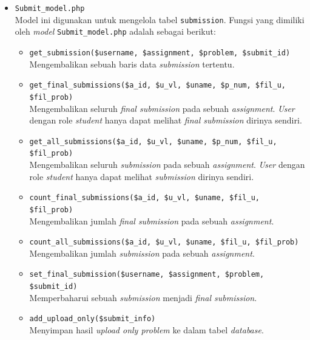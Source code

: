 \documentclass[a4paper,twoside]{article}
\begin{document}
\begin{enumerate}
\begin{itemize}
\begin{itemize}
			                  \vspace{0.5cm}
			            \item \verb|Submit_model.php| \\
			                  Model ini digunakan untuk mengelola tabel \verb|submission|. Fungsi yang dimiliki oleh \textit{model} \verb|Submit_model.php| adalah sebagai berikut:

			                  \begin{itemize}
				                  \item \verb|get_submission($username, $assignment, $problem, $submit_id)| \\
				                        Mengembalikan sebuah baris data \textit{submission} tertentu.
				                  \item \verb|get_final_submissions($a_id, $u_vl, $uname, $p_num, $fil_u, $fil_prob)| \\
				                        Mengembalikan seluruh \textit{final submission} pada sebuah \textit{assignment}. \textit{User} dengan role \textit{student} hanya dapat melihat \textit{final submission} dirinya sendiri.
				                  \item \verb|get_all_submissions($a_id, $u_vl, $uname, $p_num, $fil_u, $fil_prob)| \\
				                        Mengembalikan seluruh \textit{submission} pada sebuah \textit{assignment}. \textit{User} dengan role \textit{student} hanya dapat melihat \textit{submission} dirinya sendiri.
				                  \item \verb|count_final_submissions($a_id, $u_vl, $uname, $fil_u, $fil_prob)| \\
				                        Mengembalikan jumlah \textit{final submission} pada sebuah \textit{assignment}.
				                  \item \verb|count_all_submissions($a_id, $u_vl, $uname, $fil_u, $fil_prob)| \\
				                        Mengembalikan jumlah \textit{submission} pada sebuah \textit{assignment}.
				                  \item \verb|set_final_submission($username, $assignment, $problem, $submit_id)| \\
				                        Memperbaharui sebuah \textit{submission} menjadi \textit{final submission}.
				                  \item \verb|add_upload_only($submit_info)| \\
				                        Menyimpan hasil \textit{upload only problem} ke dalam tabel \textit{database}.
			                  \end{itemize}


\end{itemize}
\end{itemize}
\end{enumerate}
\end{document}
